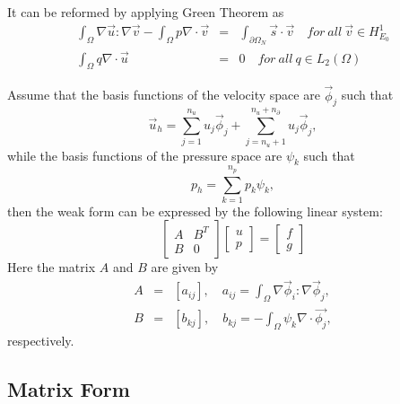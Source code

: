 \documentclass[a4paper]{article}
\begin{document}
It can be reformed by applying Green Theorem as
\begin{equation}
\begin{array}{rcl}
\int_\Omega \nabla \vec{u} : \nabla \vec{v} - \int_\Omega p\nabla
\cdot \vec{v} &=& \int_{\partial \Omega_N}\vec{s}\cdot \vec{v} \quad
for \ all \ \vec{v} \in H^1_{E_0}\\ \int_\Omega q\nabla \cdot \vec{u}
&=& 0 \quad for \ all \ q\in L_2(\Omega)
\label{eq::Stokes}
\end{array}
\end{equation}

Assume that the basis functions of the velocity space are
{$\vec{\phi}_j$} such that
\begin{equation}
\vec{u}_h = \sum^{n_u}_{j=1}u_j\vec{\phi}_j + \sum^{n_u + n_\partial}_{j=n_u+1}u_j\vec{\phi}_j,
\label{eq::Stokes-u}
\end{equation}
while the basis functions of the pressure space are $\psi_k$ such that
\begin{equation}
p_h = \sum^{n_p}_{k=1}p_k\psi_k,
\label{eq::Stokes-p}
\end{equation}
then the weak form can be expressed by the following linear system:
\begin{equation}
\left[ \begin{array}{ccc}
A & B^T \\
B & 0
\end{array}
\right]
\left[\begin{array}{ccc}
u\\
p
\end{array}
\right]=
\left[\begin{array}{ccc}
f\\
g
\end{array}
\right]
\label{mt::Stokes}
\end{equation}
Here the matrix $A$ and $B$ are given by
\begin{equation}
\begin{array}{rcl}
A &=& [a_{ij}], \quad a_{ij} = \int_{\Omega} \nabla \vec{\phi}_i :
\nabla \vec{\phi}_j,\\ B &=& [b_{kj}], \quad b_{kj} = -\int_{\Omega}
\psi_k\nabla \cdot \vec{\phi_j},
\end{array}
\end{equation}
respectively.


\subsection{Matrix Form}
\end{document}

